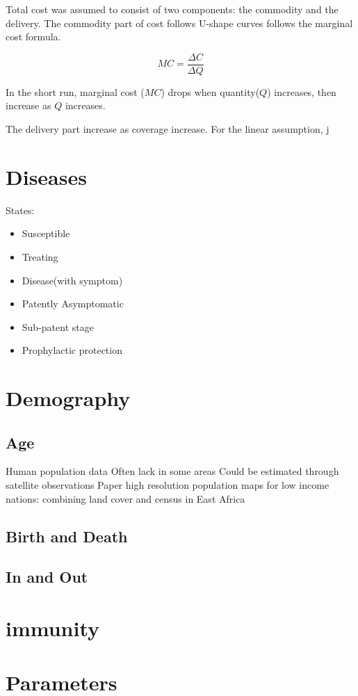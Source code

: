 \documentclass[a4paper, 12pt, twoside]{article}
\begin{document}
Total cost was assumed to consist of two components: the commodity and the delivery. The commodity part of cost follows U-shape curves follows the marginal cost formula.

$$ MC = \frac{\Delta C}{\Delta Q} $$

In the short run, marginal cost ($MC$) drops when quantity($Q$) increases, then increase as $Q$ increases.

The delivery part increase as coverage increase. For the linear assumption, j

\section{Diseases}
States:
\begin{itemize}
	\item Susceptible
	\item Treating
	\item Disease(with symptom)
	\item Patently Asymptomatic
	\item Sub-patent stage
	\item Prophylactic protection
\end{itemize}
\section{Demography}
\subsection{Age}
Human population data
Often lack in some areas
Could be estimated through satellite observations
	Paper high resolution population maps for low income nations: combining land cover and census in East Africa

\subsection{Birth and Death}
\subsection{In and Out}

\section{immunity}

\section{Parameters}

\appendix
\printglossaries
\printnomenclature


\end{document}
